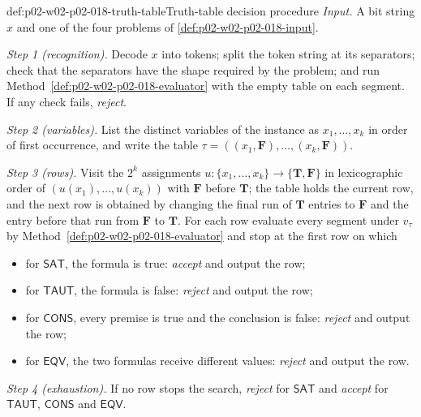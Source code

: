 \begin{hbmethod}{def:p02-w02-p02-018-truth-table}{Truth-table decision procedure}
\emph{Input.}  A bit string \(x\) and one of the four problems of
\cref{def:p02-w02-p02-018-input}.

\emph{Step 1 (recognition).}  Decode \(x\) into tokens; split the token string
at its separators; check that the separators have the shape required by the
problem; and run Method~\ref{def:p02-w02-p02-018-evaluator} with the empty
table on each segment.  If any check fails, \emph{reject}.

\emph{Step 2 (variables).}  List the distinct variables of the instance as
\(x_1,\ldots,x_k\) in order of first occurrence, and write the table
\(\tau=((x_1,\mathbf F),\ldots,(x_k,\mathbf F))\).

\emph{Step 3 (rows).}  Visit the \(2^k\) assignments
\(u:\{x_1,\ldots,x_k\}\to\{\mathbf T,\mathbf F\}\) in lexicographic order of
\((u(x_1),\ldots,u(x_k))\) with \(\mathbf F\) before \(\mathbf T\); the table
holds the current row, and the next row is obtained by changing the final
run of \(\mathbf T\) entries to \(\mathbf F\) and the entry before that
run from \(\mathbf F\) to \(\mathbf T\).  For each row evaluate every segment
under \(v_\tau\) by Method~\ref{def:p02-w02-p02-018-evaluator} and stop at the
first row on which
\begin{itemize}
\item for \(\mathsf{SAT}\), the formula is true: \emph{accept} and output the
      row;
\item for \(\mathsf{TAUT}\), the formula is false: \emph{reject} and output
      the row;
\item for \(\mathsf{CONS}\), every premise is true and the conclusion is
      false: \emph{reject} and output the row;
\item for \(\mathsf{EQV}\), the two formulas receive different values:
      \emph{reject} and output the row.
\end{itemize}
\emph{Step 4 (exhaustion).}  If no row stops the search, \emph{reject} for
\(\mathsf{SAT}\) and \emph{accept} for \(\mathsf{TAUT}\), \(\mathsf{CONS}\)
and \(\mathsf{EQV}\).
\end{hbmethod}

